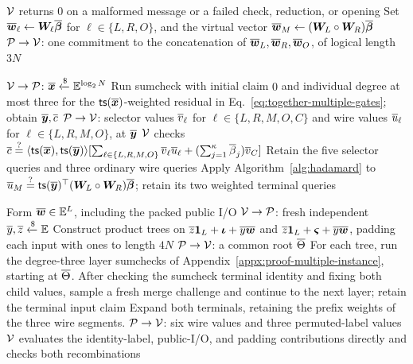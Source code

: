 \begin{algorithm}[!t]
\footnotesize
\linespread{0.97}\selectfont
\caption{PLONK proof with packing across instances}
\label{alg:multiple-instance-packing}

\(\mathcal{V}\) returns \(0\) on a malformed message or a failed
check, reduction, or opening\;
Set \(\overline{\bm w}_\ell\leftarrow\bm W_\ell\overline{\bm\beta}\)
for \(\ell\in\{L,R,O\}\), and the virtual vector
\(\overline{\bm w}_M\leftarrow(\bm W_L\circ\bm W_R)\overline{\bm\beta}\)\;
\({\mathcal{P} \rightarrow \mathcal{V}}\): one commitment to the concatenation of
\(\overline{\bm w}_L,\overline{\bm w}_R,\overline{\bm w}_O\),
of logical length \(3N\)\;

\({\mathcal{V} \rightarrow \mathcal{P}}\): \(\overline{\bm x}\mathrel{\xleftarrow{\$}}\mathbb{E}^{\log_2N}\)\;
Run sumcheck with initial claim \(0\) and individual degree at most
three for the \({\sf ts}(\overline{\bm x})\)-weighted residual in
Eq.~\eqref{eq:together-multiple-gates};
obtain \(\overline{\bm y},\overline{c}\)\;
\({\mathcal{P} \rightarrow \mathcal{V}}\): selector values \(\overline{v}_\ell\) for
\(\ell\in\{L,R,M,O,C\}\) and wire values \(\overline{u}_\ell\) for
\(\ell\in\{L,R,M,O\}\), at \(\overline{\bm y}\)\;
\(\mathcal{V}\) checks
\(\overline{c}\mathrel{\overset{\mathrm{?}}{=}}
\langle{\sf ts}(\overline{\bm x}),{\sf ts}(\overline{\bm y})\rangle
[\sum_{\ell\in\{L,R,M,O\}}\overline{v}_\ell\overline{u}_\ell+
(\sum_{j=1}^{\kappa}\overline{\beta}_j)\overline{v}_C]\)\;
Retain the five selector queries and three ordinary wire queries\;
Apply Algorithm~\ref{alg:hadamard} to
\(\overline{u}_M\mathrel{\overset{\mathrm{?}}{=}}
{\sf ts}(\overline{\bm y})^\top
(\bm W_L\circ\bm W_R)\overline{\bm\beta}\);
retain its two weighted terminal queries\;

Form \(\overline{\bm w}\in\mathbb{E}^L\), including the packed public I/O\;
\({\mathcal{V} \rightarrow \mathcal{P}}\): fresh independent
\(\overline{y},\overline{z}\mathrel{\xleftarrow{\$}}\mathbb{E}\)\;
Construct product trees on
\(\overline{z}\bm1_L+\bm\iota+\overline{y}\overline{\bm w}\) and
\(\overline{z}\bm1_L+\bm\varsigma+\overline{y}\overline{\bm w}\),
padding each input with ones to length \(4N\)\;
\({\mathcal{P} \rightarrow \mathcal{V}}\): a common root \(\overline{\Theta}\)\;
For each tree, run the degree-three layer sumchecks of
Appendix~\ref{appx:proof-multiple-instance}, starting at \(\overline{\Theta}\).
After checking the sumcheck terminal identity and fixing both child values,
sample a fresh merge
challenge and continue to the next layer; retain the terminal input claim\;
Expand both terminals, retaining the prefix weights of the three
wire segments. \({\mathcal{P} \rightarrow \mathcal{V}}\): six wire values and three permuted-label values\;
\(\mathcal{V}\) evaluates the identity-label, public-I/O, and padding
contributions directly and checks both recombinations\;


\end{algorithm}
